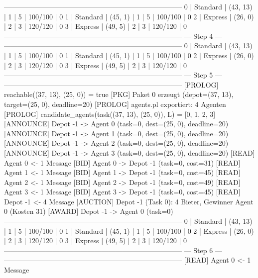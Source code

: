 -----------------------------------------------------------------------------
 0     | Standard  | (43, 13)    | 1       | 5          | 100/100   | 0
 1     | Standard  | (45, 1)     | 1       | 5          | 100/100   | 0
 2     | Express   | (26, 0)     | 2       | 3          | 120/120   | 0
 3     | Express   | (49, 5)     | 2       | 3          | 120/120   | 0
-----------------------------------------------------------------------------
                                --- Step 4 ---
-----------------------------------------------------------------------------
 0     | Standard  | (43, 13)    | 1       | 5          | 100/100   | 0
 1     | Standard  | (45, 1)     | 1       | 5          | 100/100   | 0
 2     | Express   | (26, 0)     | 2       | 3          | 120/120   | 0
 3     | Express   | (49, 5)     | 2       | 3          | 120/120   | 0
-----------------------------------------------------------------------------
                                --- Step 5 ---
-----------------------------------------------------------------------------
[PROLOG]   reachable((37, 13), (25, 0)) = true
[PKG]      Paket 0 erzeugt (depot=(37, 13), target=(25, 0), deadline=20)
[PROLOG]   agents.pl exportiert: 4 Agenten
[PROLOG]   candidate_agents(task((37, 13), (25, 0)), L) = [0, 1, 2, 3]
[ANNOUNCE] Depot -1 -> Agent 0 (task=0, dest=(25, 0), deadline=20)
[ANNOUNCE] Depot -1 -> Agent 1 (task=0, dest=(25, 0), deadline=20)
[ANNOUNCE] Depot -1 -> Agent 2 (task=0, dest=(25, 0), deadline=20)
[ANNOUNCE] Depot -1 -> Agent 3 (task=0, dest=(25, 0), deadline=20)
[READ]    Agent 0 <- 1 Message
[BID]      Agent 0 -> Depot -1 (task=0, cost=31)
[READ]    Agent 1 <- 1 Message
[BID]      Agent 1 -> Depot -1 (task=0, cost=45)
[READ]    Agent 2 <- 1 Message
[BID]      Agent 2 -> Depot -1 (task=0, cost=49)
[READ]    Agent 3 <- 1 Message
[BID]      Agent 3 -> Depot -1 (task=0, cost=45)
[READ]    Depot -1 <- 4 Message
[AUCTION] Depot -1 (Task 0): 4 Bieter, Gewinner Agent 0 (Kosten 31)
[AWARD]    Depot -1 -> Agent 0 (task=0)
-----------------------------------------------------------------------------
 0     | Standard  | (43, 13)    | 1       | 5          | 100/100   | 0
 1     | Standard  | (45, 1)     | 1       | 5          | 100/100   | 0
 2     | Express   | (26, 0)     | 2       | 3          | 120/120   | 0
 3     | Express   | (49, 5)     | 2       | 3          | 120/120   | 0
-----------------------------------------------------------------------------
                                --- Step 6 ---
-----------------------------------------------------------------------------
[READ]    Agent 0 <- 1 Message
